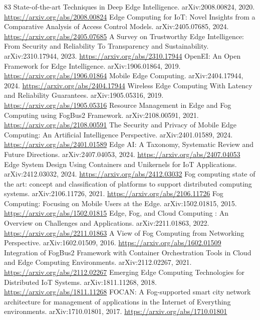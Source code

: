 \documentclass[11pt]{article}
\begin{document}
\begin{thebibliography}{83}
 State-of-the-art Techniques in Deep Edge Intelligence. arXiv:2008.00824, 2020. \url{https://arxiv.org/abs/2008.00824}
 Edge Computing for IoT: Novel Insights from a Comparative Analysis of Access Control Models. arXiv:2405.07685, 2024. \url{https://arxiv.org/abs/2405.07685}
 A Survey on Trustworthy Edge Intelligence: From Security and Reliability To Transparency and Sustainability. arXiv:2310.17944, 2023. \url{https://arxiv.org/abs/2310.17944}
 OpenEI: An Open Framework for Edge Intelligence. arXiv:1906.01864, 2019. \url{https://arxiv.org/abs/1906.01864}
 Mobile Edge Computing. arXiv:2404.17944, 2024. \url{https://arxiv.org/abs/2404.17944}
 Wireless Edge Computing With Latency and Reliability Guarantees. arXiv:1905.05316, 2019. \url{https://arxiv.org/abs/1905.05316}
 Resource Management in Edge and Fog Computing using FogBus2 Framework. arXiv:2108.00591, 2021. \url{https://arxiv.org/abs/2108.00591}
 The Security and Privacy of Mobile Edge Computing: An Artificial Intelligence Perspective. arXiv:2401.01589, 2024. \url{https://arxiv.org/abs/2401.01589}
 Edge AI: A Taxonomy, Systematic Review and Future Directions. arXiv:2407.04053, 2024. \url{https://arxiv.org/abs/2407.04053}
 Edge System Design Using Containers and Unikernels for IoT Applications. arXiv:2412.03032, 2024. \url{https://arxiv.org/abs/2412.03032}
 Fog computing state of the art: concept and classification of platforms to support distributed computing systems. arXiv:2106.11726, 2021. \url{https://arxiv.org/abs/2106.11726}
 Fog Computing: Focusing on Mobile Users at the Edge. arXiv:1502.01815, 2015. \url{https://arxiv.org/abs/1502.01815}
 Edge, Fog, and Cloud Computing : An Overview on Challenges and Applications. arXiv:2211.01863, 2022. \url{https://arxiv.org/abs/2211.01863}
 A View of Fog Computing from Networking Perspective. arXiv:1602.01509, 2016. \url{https://arxiv.org/abs/1602.01509}
 Integration of FogBus2 Framework with Container Orchestration Tools in Cloud and Edge Computing Environments. arXiv:2112.02267, 2021. \url{https://arxiv.org/abs/2112.02267}
 Emerging Edge Computing Technologies for Distributed IoT Systems. arXiv:1811.11268, 2018. \url{https://arxiv.org/abs/1811.11268}
 FOCAN: A Fog-supported smart city network architecture for management of applications in the Internet of Everything environments. arXiv:1710.01801, 2017. \url{https://arxiv.org/abs/1710.01801}

\end{thebibliography}
\end{document}
